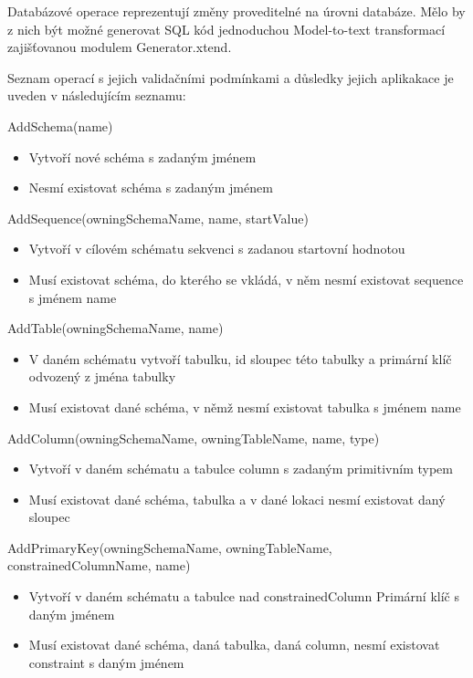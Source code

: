 \documentclass[11pt,twoside,a4paper]{book}
\begin{document}
Databázové operace reprezentují změny proveditelné na úrovni databáze. Mělo by z
nich být možné generovat SQL kód jednoduchou Model-to-text transformací
zajišťovanou modulem Generator.xtend.

Seznam operací s jejich validačními podmínkami a důsledky jejich aplikakace je
uveden v následujícím seznamu:

\begin{list}{Operace :}{} 
  \item AddSchema(name)
  \begin{itemize}
    \item Vytvoří nové schéma s zadaným jménem
    \item Nesmí existovat schéma s zadaným
    jménem
  \end{itemize}
  \item AddSequence(owningSchemaName, name, startValue)
  \begin{itemize}
    \item Vytvoří v cílovém schématu sekvenci s zadanou startovní hodnotou
    \item Musí existovat schéma, do kterého se vkládá, v něm nesmí existovat
    sequence s jménem name
  \end{itemize}
  
  \item AddTable(owningSchemaName, name)
  \begin{itemize}
    \item V daném schématu vytvoří tabulku, id sloupec této tabulky a primární
    klíč odvozený z jména tabulky
    \item Musí existovat dané schéma, v
    němž nesmí existovat tabulka s jménem name
  \end{itemize}
  
  \item AddColumn(owningSchemaName, owningTableName, name, type)
  \begin{itemize}
    \item Vytvoří v daném schématu a tabulce column s zadaným primitivním typem
    \item Musí existovat dané schéma, tabulka a v dané lokaci nesmí existovat
    daný sloupec
  \end{itemize}
  
  \item AddPrimaryKey(owningSchemaName, owningTableName,
  constrainedColumnName, name)
  \begin{itemize}
    \item Vytvoří v daném schématu a tabulce nad constrainedColumn Primární klíč
    s daným jménem
    \item Musí existovat dané schéma, daná tabulka, daná column, nesmí existovat
    constraint s daným jménem
  \end{itemize}


\end{list}
\end{document}
